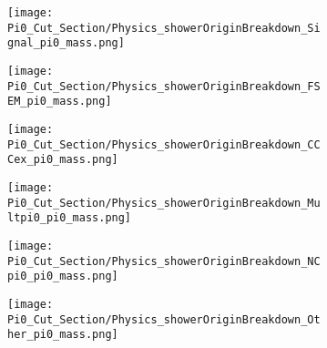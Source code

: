 \documentclass{article}
\begin{document}
\begin{figure}[H]
\centering
  \begin{subfigure}[t]{0.25\textwidth}
    \centering
\texttt{[image: Pi0\_Cut\_Section/Physics\_showerOriginBreakdown\_Signal\_pi0\_mass.png]}
  \caption{ }
  \end{subfigure} 
  \hspace{5mm}
  \begin{subfigure}[t]{0.25\textwidth}
    \centering
\texttt{[image: Pi0\_Cut\_Section/Physics\_showerOriginBreakdown\_FSEM\_pi0\_mass.png]}
  \caption{ }
  \end{subfigure} 
  \hspace{5mm}
  \begin{subfigure}[t]{0.25\textwidth}
    \centering
\texttt{[image: Pi0\_Cut\_Section/Physics\_showerOriginBreakdown\_CCCex\_pi0\_mass.png]}
  \caption{ }
  \end{subfigure} 
  \hspace{5mm}
  \begin{subfigure}[t]{0.25\textwidth}
    \centering
\texttt{[image: Pi0\_Cut\_Section/Physics\_showerOriginBreakdown\_Multpi0\_pi0\_mass.png]}
  \caption{ }
  \end{subfigure} 
  \hspace{5mm}
  \begin{subfigure}[t]{0.25\textwidth}
    \centering
\texttt{[image: Pi0\_Cut\_Section/Physics\_showerOriginBreakdown\_NCpi0\_pi0\_mass.png]}
  \caption{ }
  \end{subfigure} 
  \hspace{5mm}
  \begin{subfigure}[t]{0.25\textwidth}
    \centering
\texttt{[image: Pi0\_Cut\_Section/Physics\_showerOriginBreakdown\_Other\_pi0\_mass.png]}
  \caption{ }
  \end{subfigure} 

\end{figure}
\end{document}
